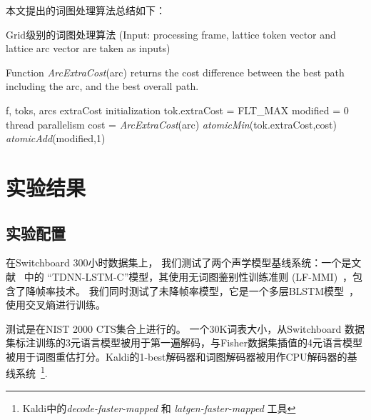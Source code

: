 本文提出的词图处理算法总结如下：
 \vspace{-0.25em}
 \begin{algorithm}[ht]
 \caption{Grid级别的词图处理算法  \textcolor[rgb]{0,0.5,0}{(Input: processing frame, lattice token vector and lattice arc vector are taken as inputs)}}
 \label{code:exact-lattice}
 \begin{flushleft}
 Function {\em{ArcExtraCost}}(arc) returns the cost difference between the best path including the arc, and the best overall path.
 \end{flushleft}
 \begin{algorithmic}[1]
  {f, toks, arcs}
  \Comment \textcolor[rgb]{0.8,0,0}{extraCost initialization}
 \State tok.extraCost = FLT\_MAX
 \EndFor
 \State  modified = 0
  \Comment \textcolor[rgb]{0.8,0,0}{thread parallelism }
 \State cost = \textit{ArcExtraCost}(arc)
 \State \textit{atomicMin}(tok.extraCost,cost)
 \State \textit{atomicAdd}(modified,1)
 \EndIf
 \EndFor
 \EndWhile
 \EndProcedure
 \end{algorithmic}
 \end{algorithm}

\section{实验结果}
\label{chap:gpu-exp}

\subsection{实验配置}
在Switchboard 300小时数据集上，
我们测试了两个声学模型基线系统：一个是文献 ~\cite{peddinti2018low}中的 ``TDNN-LSTM-C''模型，其使用无词图鉴别性训练准则 (LF-MMI)~\cite{povey2016purely}，包含了降帧率技术。
我们同时测试了未降帧率模型，它是一个多层BLSTM模型~\cite{sak2014long}，使用交叉熵进行训练。%

测试是在NIST 2000 CTS集合上进行的。
一个30K词表大小，从Switchboard 数据集标注训练的3元语言模型被用于第一遍解码，与Fisher数据集插值的4元语言模型被用于词图重估打分。Kaldi的1-best解码器和词图解码器被用作CPU解码器的基线系统~\footnote{Kaldi中的{\em{decode-faster-mapped}} 和 {\em{latgen-faster-mapped}} 工具}.

